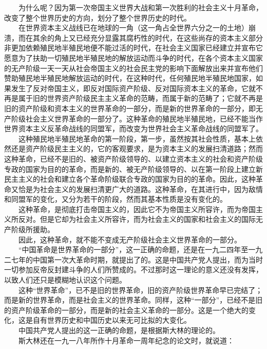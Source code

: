 \documentclass[cn,11pt,chinese]{elegantbook}
\begin{document}
　　为什么呢？因为第一次帝国主义世界大战和第一次胜利的社会主义十月革命，改变了整个世界历史的方向，划分了整个世界历史的时代。\\
　　在世界资本主义战线已在地球的一角（这一角占全世界六分之一的土地）崩溃，而在其余的角上又已经充分显露其腐朽性的时代，在这些尚存的资本主义部分非更加依赖殖民地半殖民地便不能过活的时代，在社会主义国家已经建立并宣布它愿意为了扶助一切殖民地半殖民地的解放运动而斗争的时代，在各个资本主义国家的无产阶级一天一天从社会帝国主义的社会民主党的影响下面解放出来并宣布他们赞助殖民地半殖民地解放运动的时代，在这种时代，任何殖民地半殖民地国家，如果发生了反对帝国主义，即反对国际资产阶级、反对国际资本主义的革命，它就不再是属于旧的世界资产阶级民主主义革命的范畴，而属于新的范畴了；它就不再是旧的资产阶级和资本主义的世界革命的一部分，而是新的世界革命的一部分，即无产阶级社会主义世界革命的一部分了。这种革命的殖民地半殖民地，已经不能当作世界资本主义反革命战线的同盟军，而改变为世界社会主义革命战线的同盟军了。\\
　　这种殖民地半殖民地革命的第一阶段，第一步，虽然按其社会性质，基本上依然还是资产阶级民主主义的，它的客观要求，是为资本主义的发展扫清道路；然而这种革命，已经不是旧的、被资产阶级领导的、以建立资本主义的社会和资产阶级专政的国家为目的的革命，而是新的、被无产阶级领导的、以在第一阶段上建立新民主主义的社会和建立各个革命阶级联合专政的国家为目的的革命。因此，这种革命又恰是为社会主义的发展扫清更广大的道路。这种革命，在其进行中，因为敌情和同盟军的变化，又分为若干的阶段，然而其基本性质是没有变化的。\\
　　这种革命，是彻底打击帝国主义的，因此它不为帝国主义所容许，而为帝国主义所反对。但是它却为社会主义所容许，而为社会主义的国家和社会主义的国际无产阶级所援助。\\
　　因此，这种革命，就不能不变成无产阶级社会主义世界革命的一部分。\\
　　“中国革命是世界革命的一部分”，这一正确的命题，还是在一九二四年至一九二七年的中国第一次大革命时期，就提出了的。这是中国共产党人提出，而为当时一切参加反帝反封建斗争的人们所赞成的。不过那时这一理论的意义还没有发挥，以致人们还只是模糊地认识这个问题。\\
　　这种“世界革命”，已不是旧的世界革命，旧的资产阶级世界革命早已完结了；而是新的世界革命，而是社会主义的世界革命。同样，这种“一部分”，已经不是旧的资产阶级革命的一部分，而是新的社会主义革命的一部分。这是一个绝大的变化，这是自有世界历史和中国历史以来无可比拟的大变化。\\
　　中国共产党人提出的这一正确的命题，是根据斯大林的理论的。\\
　　斯大林还在一九一八年所作十月革命一周年纪念的论文时，就说道：\\
\end{document}
